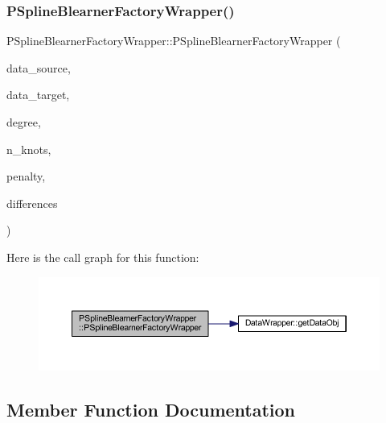 \subsubsection{\texorpdfstring{P\+Spline\+Blearner\+Factory\+Wrapper()}{PSplineBlearnerFactoryWrapper()}}
{\footnotesize\ttfamily P\+Spline\+Blearner\+Factory\+Wrapper\+::\+P\+Spline\+Blearner\+Factory\+Wrapper (\begin{DoxyParamCaption}\item[{\mbox{\hyperlink{class_data_wrapper}{Data\+Wrapper}} \&}]{data\+\_\+source,  }\item[{\mbox{\hyperlink{class_data_wrapper}{Data\+Wrapper}} \&}]{data\+\_\+target,  }\item[{const unsigned int \&}]{degree,  }\item[{const unsigned int \&}]{n\+\_\+knots,  }\item[{const double \&}]{penalty,  }\item[{const unsigned int \&}]{differences }\end{DoxyParamCaption})\hspace{0.3cm}{\ttfamily [inline]}}

Here is the call graph for this function\+:\nopagebreak
\begin{figure}[H]
\begin{center}
\leavevmode
\includegraphics[width=350pt]{class_p_spline_blearner_factory_wrapper_a3ff597f06068aa467bd6646d267fb861_cgraph}
\end{center}
\end{figure}


\subsection{Member Function Documentation}
\mbox{\label{class_p_spline_blearner_factory_wrapper_a13ca216f7c9673bb66598c9be0e44b03}} 
